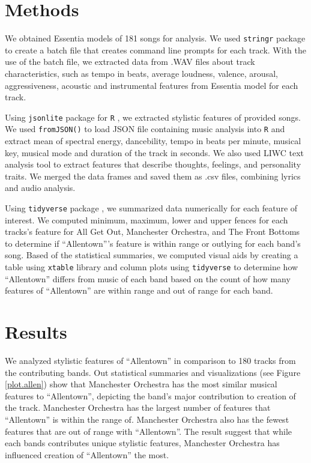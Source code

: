 \documentclass{article}\usepackage[]{graphicx}\usepackage[]{xcolor}
\begin{document}
\begin{multicols}{2}
\section{Methods}
We obtained Essentia models \citep{alonso2020tensorflow} of 181 songs for analysis. We used \texttt{stringr} package \citep{stringr} to create a batch file that creates command line prompts for each track. With the use of the batch file, we extracted data from .WAV files about track characteristics, such as tempo in beats, average loudness, valence, arousal, aggressiveness, acoustic and instrumental features from Essentia model for each track. 

Using \texttt{jsonlite} package for \texttt{R} \citep{jsonlite}, we extracted stylistic features of provided songs. We used \texttt{fromJSON()} to load JSON file containing music analysis into \texttt{R} and extract mean of spectral energy, dancebility, tempo in beats per minute, musical key, musical mode and duration of the track in seconds. We also used LIWC text analysis tool \citep{boyd2022development} to extract features that describe thoughts, feelings, and personality traits. We merged the data frames and saved them as .csv files, combining lyrics and audio analysis. 

Using \texttt{tidyverse} package \citep{tidyverse}, we summarized data numerically for each feature of interest. We computed minimum, maximum, lower and upper fences for each tracks's feature for All Get Out, Manchester Orchestra, and The Front Bottoms to determine if ``Allentown'''s feature is within range or outlying for each band's song. Based of the statistical summaries, we computed visual aids by creating a table using \texttt{xtable} library \citep{xtable} and column plots using \texttt{tidyverse} to determine how ``Allentown'' differs from music of each band based on the count of how many features of ``Allentown'' are within range and out of range for each band.


\section{Results}
We analyzed stylistic features of ``Allentown'' in comparison to 180 tracks from the contributing bands. Out statistical summaries and visualizations (see Figure \ref{plot.allen}) show that Manchester Orchestra has the most similar musical features to ``Allentown'', depicting the band's major contribution to creation of the track. Manchester Orchestra has the largest number of features that ``Allentown'' is within the range of. Manchester Orchestra also has the fewest features that are out of range with ``Allentown''. The result suggest that while each bands contributes unique stylistic features, Manchester Orchestra has influenced creation of ``Allentown'' the most.


\end{multicols}
\end{document}
